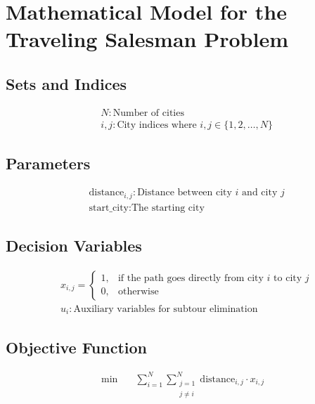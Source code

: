 \documentclass{article}
\begin{document}
\section*{Mathematical Model for the Traveling Salesman Problem}

\subsection*{Sets and Indices}
\begin{align*}
& N: \text{Number of cities} \\
& i, j: \text{City indices where } i, j \in \{1, 2, \ldots, N\}
\end{align*}

\subsection*{Parameters}
\begin{align*}
& \text{distance}_{i,j}: \text{Distance between city } i \text{ and city } j \\
& \text{start\_city}: \text{The starting city}
\end{align*}

\subsection*{Decision Variables}
\begin{align*}
& x_{i,j} = 
  \begin{cases} 
  1, & \text{if the path goes directly from city } i \text{ to city } j \\
  0, & \text{otherwise}
  \end{cases} \\
& u_i: \text{Auxiliary variables for subtour elimination} 
\end{align*}

\subsection*{Objective Function}
\begin{align*}
\min \quad & \sum_{i=1}^{N}\sum_{\substack{j=1 \\ j \neq i}}^{N} \text{distance}_{i,j} \cdot x_{i,j}
\end{align*}
\end{document}
